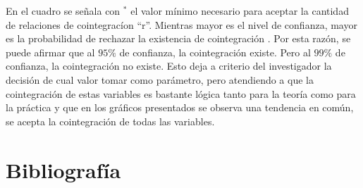 \documentclass[11pt,a4paper]{article}
\begin{document}
En el cuadro se señala con $^* $ el valor mínimo necesario para aceptar la cantidad de relaciones de cointegracíon ``r''. Mientras mayor es el nivel de confianza, mayor es la probabilidad de rechazar la existencia de cointegración . Por esta razón, se puede afirmar que al $95\%$ de confianza, la cointegración existe. Pero al $99 \% $ de confianza, la cointegración no existe. Esto deja a criterio del investigador la decisión de cual valor tomar como parámetro, pero atendiendo a que la cointegración de estas variables es bastante lógica tanto para la teoría como para la práctica y que en los gráficos presentados se observa una tendencia en común, se acepta la cointegración de todas las variables.

\clearpage
\section{Bibliografía}
\end{document}
